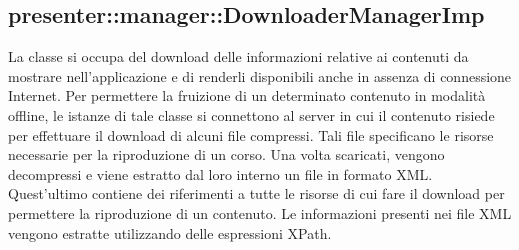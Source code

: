 \documentclass[../Tesi.tex]{subfiles}
\begin{document}
		\subsection{presenter::manager::DownloaderManagerImp}
		La classe  si occupa del download delle informazioni relative ai contenuti da mostrare nell'applicazione e di renderli disponibili anche in assenza di connessione Internet. Per permettere la fruizione di un determinato contenuto in modalità offline, le istanze di tale classe si connettono al server in cui il contenuto risiede per effettuare il download di alcuni file compressi. Tali file specificano le risorse necessarie per la riproduzione di un corso. Una volta scaricati, vengono decompressi e viene estratto dal loro interno un file in formato XML. Quest'ultimo contiene dei riferimenti a tutte le risorse di cui fare il download per permettere la riproduzione di un contenuto. Le informazioni presenti nei file XML vengono estratte utilizzando delle espressioni XPath.
\end{document}
